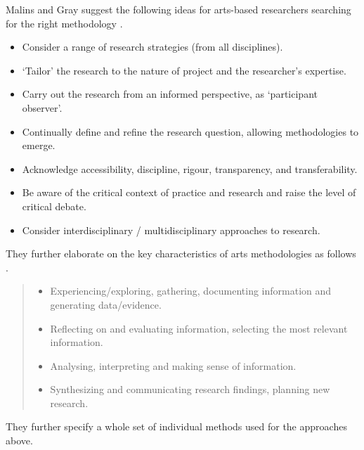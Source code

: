 Malins and Gray suggest the following ideas for arts-based researchers searching for the right methodology \autocite*{Malins1995}.

\begin{itemize}
  \item Consider a range of research strategies (from all disciplines).
  \item `Tailor' the research to the nature of project and the researcher's expertise.
  \item Carry out the research from an informed perspective, as `participant observer'.
  \item Continually define and refine the research question, allowing methodologies to emerge.
  \item Acknowledge accessibility, discipline, rigour, transparency, and transferability.
  \item Be aware of the critical context of practice and research and raise the level of critical debate.
  \item Consider interdisciplinary / multidisciplinary approaches to research.
\end{itemize}

They further elaborate on the key characteristics of arts methodologies as follows \autocite{Gray2004}.

\begin{quotation}
\begin{itemize}
  \item Experiencing/exploring, gathering, documenting information and generating data/evidence.
  \item Reflecting on and evaluating information, selecting the most relevant information.
  \item Analysing, interpreting and making sense of information.
  \item Synthesizing and communicating research findings, planning new research.
\end{itemize}
\end{quotation}

They further specify a whole set of individual methods used for the approaches above.

